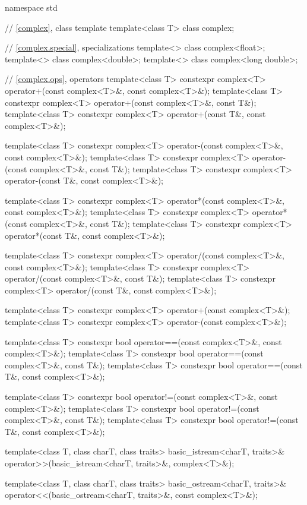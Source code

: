 %
\begin{codeblock}
namespace std {
  // \ref{complex}, class template 
  template<class T> class complex;

  // \ref{complex.special}, specializations
  template<> class complex<float>;
  template<> class complex<double>;
  template<> class complex<long double>;

  // \ref{complex.ops}, operators
  template<class T> constexpr complex<T> operator+(const complex<T>&, const complex<T>&);
  template<class T> constexpr complex<T> operator+(const complex<T>&, const T&);
  template<class T> constexpr complex<T> operator+(const T&, const complex<T>&);

  template<class T> constexpr complex<T> operator-(const complex<T>&, const complex<T>&);
  template<class T> constexpr complex<T> operator-(const complex<T>&, const T&);
  template<class T> constexpr complex<T> operator-(const T&, const complex<T>&);

  template<class T> constexpr complex<T> operator*(const complex<T>&, const complex<T>&);
  template<class T> constexpr complex<T> operator*(const complex<T>&, const T&);
  template<class T> constexpr complex<T> operator*(const T&, const complex<T>&);

  template<class T> constexpr complex<T> operator/(const complex<T>&, const complex<T>&);
  template<class T> constexpr complex<T> operator/(const complex<T>&, const T&);
  template<class T> constexpr complex<T> operator/(const T&, const complex<T>&);

  template<class T> constexpr complex<T> operator+(const complex<T>&);
  template<class T> constexpr complex<T> operator-(const complex<T>&);

  template<class T> constexpr bool operator==(const complex<T>&, const complex<T>&);
  template<class T> constexpr bool operator==(const complex<T>&, const T&);
  template<class T> constexpr bool operator==(const T&, const complex<T>&);

  template<class T> constexpr bool operator!=(const complex<T>&, const complex<T>&);
  template<class T> constexpr bool operator!=(const complex<T>&, const T&);
  template<class T> constexpr bool operator!=(const T&, const complex<T>&);

  template<class T, class charT, class traits>
    basic_istream<charT, traits>& operator>>(basic_istream<charT, traits>&, complex<T>&);

  template<class T, class charT, class traits>
    basic_ostream<charT, traits>& operator<<(basic_ostream<charT, traits>&, const complex<T>&);

}
\end{codeblock}
